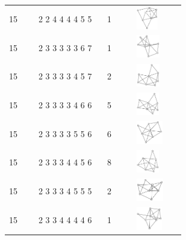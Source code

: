 \begin{table}[h!]
\begin{tabular}{m{0.15\linewidth} m{0.35\linewidth} m{0.15\linewidth} m{0.25\linewidth}}
15 & 2 2 4 4 4 4 5 5 & 1 & \includegraphics[height=1cm]{15-universal-graphs/img/degree-sequences-example-graphs/graph-4-8-119}\\
15 & 2 3 3 3 3 3 6 7 & 1 & \includegraphics[height=1cm]{15-universal-graphs/img/degree-sequences-example-graphs/graph-4-8-120}\\
15 & 2 3 3 3 3 4 5 7 & 2 & \includegraphics[height=1cm]{15-universal-graphs/img/degree-sequences-example-graphs/graph-4-8-121}\\
15 & 2 3 3 3 3 4 6 6 & 5 & \includegraphics[height=1cm]{15-universal-graphs/img/degree-sequences-example-graphs/graph-4-8-122}\\
15 & 2 3 3 3 3 5 5 6 & 6 & \includegraphics[height=1cm]{15-universal-graphs/img/degree-sequences-example-graphs/graph-4-8-123}\\
15 & 2 3 3 3 4 4 5 6 & 8 & \includegraphics[height=1cm]{15-universal-graphs/img/degree-sequences-example-graphs/graph-4-8-124}\\
15 & 2 3 3 3 4 5 5 5 & 2 & \includegraphics[height=1cm]{15-universal-graphs/img/degree-sequences-example-graphs/graph-4-8-125}\\
15 & 2 3 3 4 4 4 4 6 & 1 & \includegraphics[height=1cm]{15-universal-graphs/img/degree-sequences-example-graphs/graph-4-8-126}\\

\end{tabular}
\end{table}
